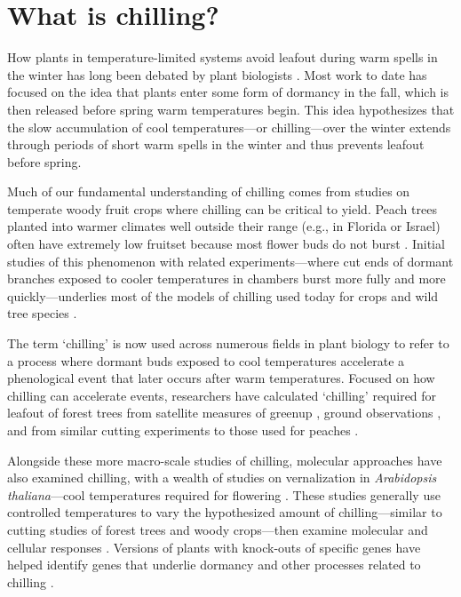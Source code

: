 \documentclass[11pt]{article}
\begin{document}
\section*{What is chilling?}

How plants in temperature-limited systems avoid leafout during warm spells in the winter has long been debated by plant biologists \citep[e.g.,][]{lamb1948effect,weinberger}. Most work to date has focused on the idea that plants enter some form of dormancy in the fall, which is then released before spring warm temperatures begin. This idea hypothesizes that the slow accumulation of cool temperatures---or chilling---over the winter extends through periods of short warm spells in the winter and thus prevents leafout before spring. 

Much of our fundamental understanding of chilling comes from studies on temperate woody fruit crops where chilling can be critical to yield. Peach trees planted into warmer climates well outside their range (e.g., in Florida or Israel) often have extremely low fruitset because most flower buds do not burst \citep{weinberger,overcash1955effects,erez1971improved}. Initial studies of this phenomenon with related experiments---where cut ends of dormant branches exposed to cooler temperatures in chambers burst more fully and more quickly---underlies most of the models of chilling used today for crops and wild tree species \citep[][]{weinberger,ospreebbms}. %

The term `chilling' is now used across numerous fields in plant biology to refer to a process where dormant buds exposed to cool temperatures accelerate a phenological event that later occurs after warm temperatures. Focused on how chilling can accelerate events, researchers have calculated `chilling' required for leafout of forest trees from satellite measures of greenup \citep{kaduk2011predicting}, ground observations \citep{Luedeling2009}, and from similar cutting experiments to those used for peaches \citep[reviewed in][]{ospreebbms}.  %

Alongside these more macro-scale studies of chilling, molecular approaches have also examined chilling, with a wealth of studies on vernalization in \emph{Arabidopsis thaliana}---cool temperatures required for flowering \citep{kim2009vernalization}. These studies generally use controlled temperatures to vary the hypothesized amount of chilling---similar to cutting studies of forest trees and woody crops---then examine molecular and cellular responses \citep[e.g.,][]{pan2021aba,azeez2021early,cai2024molecular}. Versions of plants with knock-outs of specific genes have helped identify genes that underlie dormancy and other processes related to chilling \citep{songstad2017genome}. 
\end{document}
